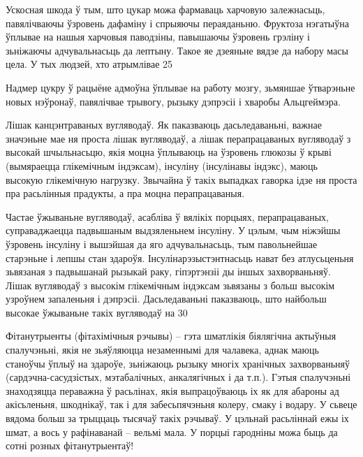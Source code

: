Ускосная шкода ў тым, што цукар можа фармаваць харчовую залежнасьць, павялічваючы ўзровень дафаміну і спрыяючы пераяданьню. Фруктоза нэгатыўна ўплывае на нашыя харчовыя паводзіны, павышаючы ўзровень грэліну і зьніжаючы адчувальнасьць да лептыну. Такое яе дзеяньне вядзе да набору масы цела. У тых людзей, хто атрымлівае 25%

Надмер цукру ў рацыёне адмоўна ўплывае на работу мозгу, зьмяншае ўтварэньне новых нэўронаў, павялічвае трывогу, рызыку дэпрэсіі і хваробы Альцгеймэра.

Лішак канцэнтраваных вугляводаў.
Як паказваюць дасьледаваньні, важнае значэньне мае ня проста лішак вугляводаў, а лішак перапрацаваных вугляводаў з высокай шчыльнасьцю, якія моцна ўплываюць на ўзровень глюкозы ў крыві (вымяраецца глікемічным індэксам), інсуліну (інсулінавы індэкс), маюць высокую глікемічную нагрузку. Звычайна ў такіх выпадках гаворка ідзе ня проста пра расьлінныя прадукты, а пра моцна перапрацаваныя.

Частае ўжываньне вугляводаў, асабліва ў вялікіх порцыях, перапрацаваных, суправаджаецца падвышаным выдзяленьнем інсуліну. У цэлым, чым ніжэйшы ўзровень інсуліну і вышэйшая да яго адчувальнасьць, тым павольнейшае старэньне і лепшы стан здароўя. Інсулінарэзыстэнтнасьць нават без атлусьценьня зьвязаная з падвышанай рызыкай раку, гіпэртэнзіі ды іншых захворваньняў. Лішак вугляводаў з высокім глікемічным індэксам зьвязаны з больш высокім узроўнем запаленьня і дэпрэсіі. Дасьледаваньні паказваюць, што найбольш высокае ўжываньне такіх вугляводаў на 30%

Фітанутрыенты (фітахімічныя рэчывы) – гэта шматлікія біялягічна актыўныя спалучэньні, якія не зьяўляюцца незаменнымі для чалавека, аднак маюць станоўчы ўплыў на здароўе, зьніжаюць рызыку многіх хранічных захворваньняў (сардэчна-сасудзістых, мэтабалічных, анкалягічных і да т.п.). Гэтыя спалучэньні знаходзяцца пераважна ў расьлінах, якія выпрацоўваюць іх як для абароны ад акісьленьня, шкоднікаў, так і для забесьпячэньня колеру, смаку і водару. У сьвеце вядома больш за трыццаць тысячаў такіх рэчываў. У цэльнай расьліннай ежы іх шмат, а вось у рафінаванай – вельмі мала. У порцыі гародніны можа быць да сотні розных фітанутрыентаў!

